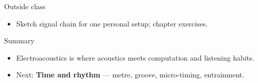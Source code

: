 \documentclass[aspectratio=169]{beamer}
\begin{document}
\begin{frame}{Outside class}
  \begin{itemize}
    \item Sketch signal chain for one personal setup; chapter exercises.
  \end{itemize}
\end{frame}

\begin{frame}{Summary}
  \begin{itemize}
    \item Electroacoustics is where acoustics meets computation and listening habits.
    \item Next: \textbf{Time and rhythm} — metre, groove, micro-timing, entrainment.
  \end{itemize}
\end{frame}
\end{document}

